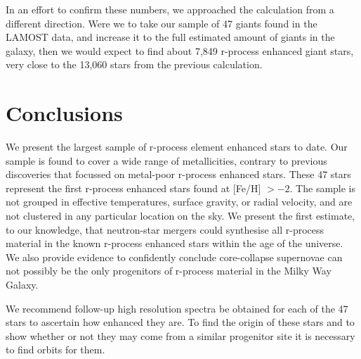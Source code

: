 \documentclass[a4paper,fleqn,usenatbib]{mnras}
\begin{document}
    In an effort to confirm these numbers, we approached the calculation from a different direction. Were we to take our sample of 47 giants found in the LAMOST data, and increase it to the full estimated amount of giants in the galaxy, then we would expect to find about 7,849 r-process enhanced giant stars, very close to the 13,060 stars from the previous calculation.
	
	\section{Conclusions}
	We present the largest sample of r-process element enhanced stars to date. Our sample is found to cover a wide range of metallicities, contrary to previous discoveries that focussed on metal-poor r-process enhanced stars. These 47 stars represent the first r-process enhanced stars found at [Fe/H] $>-2$. The sample is not grouped in effective temperatures, surface gravity, or radial velocity, and are not clustered in any  particular location on the sky. We present the first estimate, to our knowledge, that neutron-star mergers could synthesise all r-process material in the known r-process enhanced stars within the age of the universe. We also provide evidence to confidently conclude core-collapse supernovae can not possibly be the only progenitors of r-process material in the Milky Way Galaxy.
	
	We recommend follow-up high resolution spectra be obtained for each of the 47 stars to ascertain how enhanced they are. To find the origin of these stars and to show whether or not they may come from a similar progenitor site it is necessary to find orbits for them.
	
	
	
\end{document}

